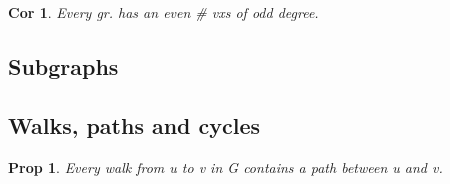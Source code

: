 \documentclass[11pt, fleqn, a4paper, landscape]{article}
\theoremstyle{plain} %
\newtheorem{pro}[thm]{Prop}
\newtheorem{cor}[thm]{Cor}
\theoremstyle{remark} %
\theoremstyle{definition} %
\newtheorem{defi}[thm]{Def}
\begin{document}
\begin{multicols}{5}
\begin{cor}
Every gr. has an even \# vxs of odd degree.
\end{cor}

\subsection{Subgraphs}


\addtocounter{thm}{3}
\addtocounter{subsection}{1} 

\addtocounter{thm}{1}
\addtocounter{thm}{1}
\subsection{Walks, paths and cycles}
%
%
\addtocounter{thm}{3}
\begin{pro}
Every walk from u to v in G contains a path between u and v.
\end{pro}


\end{multicols}
\end{document}
